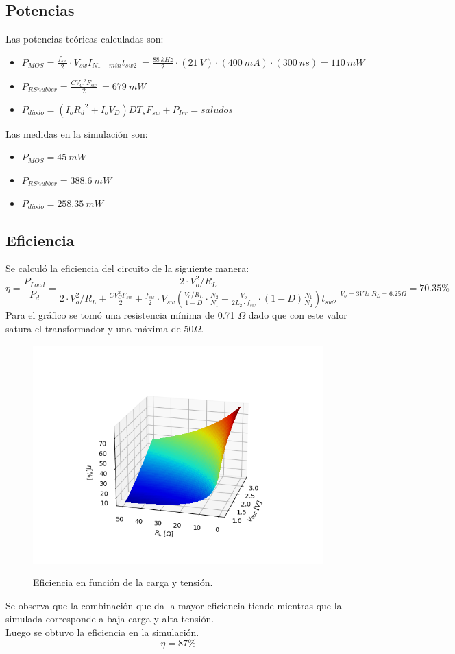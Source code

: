 \subsection{Potencias}
Las potencias teóricas calculadas son:
\begin{itemize}
\item $ P_{MOS} =\frac{f_{sw}}{2}\cdot V_{sw}I_{N1-min} t_{sw2}\ =\frac{88 \ kHz}{2}\cdot (21 \ V) \cdot (400 \ mA) \cdot (300 \ ns) = 110\ mW$
\item $ P_{RSnubber} = \frac{C{V_C}^2 F_{sw}}{2}\ = 679 \ mW$
\item $P_{diodo} = (I_o{R_d}^2 + I_oV_D)DT_sF_{sw} + P_{Irr} = saludos$ 

\end{itemize}
Las medidas en la simulación son:
\begin{itemize}
\item $ P_{MOS} = 45 \ mW $
\item $ P_{RSnubber} = 388.6 \ mW$
\item $ P_{diodo} = 258.35 \ mW$
\end{itemize}

\subsection{Eficiencia}
Se calculó la eficiencia del circuito de la siguiente manera:
\begin{equation}
\eta =\frac{P_{Load}}{P_{d}} = \frac{2 \cdot V_o^2 / R_L}{2 \cdot V_o^2 / R_L + \frac{CV_C^2 F_{sw}}{2} + \frac{f_{sw}}{2} \cdot V_{sw} \left( \frac{V_o / R_L}{1-D} \cdot \frac{N_2}{N_1} - \frac{V_o}{2L_2 \cdot f_{sw}} \cdot (1-D) \frac{N_1}{N_2}  \right) t_{sw2} } \Big\rvert_{V_o=3 V\ \& \ R_L=6.25 \Omega } = 70.35\%
\end{equation}
Para el gráfico se tomó una resistencia mínima de 0.71 $\Omega$ dado que con este valor satura el transformador y una máxima de 50$\Omega$.
\begin{figure}[H]
	\centering
	\includegraphics[width=0.5\linewidth]{ImagenesParteII/Eff.png}
	\label{fig:etar}
	\caption{Eficiencia en función de la carga y tensión.}
\end{figure}
Se observa que la combinación que da la mayor eficiencia tiende 
mientras que la simulada corresponde a baja carga y alta tensión.\\
Luego se obtuvo la eficiencia en la simulación.
\begin{equation}
\eta = 87\%
\end{equation}
%
